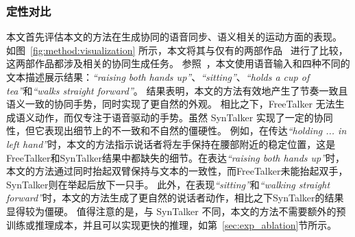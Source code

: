 \subsubsection{定性对比}
本文首先评估本文的方法在生成协同的语音同步、语义相关的运动方面的表现。
如图~\ref{fig:method:visualization} 所示，本文将其与仅有的两部作品~\cite{yang2024freetalker,chen2024syntalker} 进行了比较，这两部作品都涉及相关的协同生成任务。
参照~\cite{chen2024syntalker}，本文使用语音输入和四种不同的文本描述展示结果：\textit{``raising both hands up''}、\textit{``sitting''}、\textit{``holds a cup of tea''}和\textit{``walks straight forward''}。
结果表明，本文的方法有效地产生了节奏一致且语义一致的协同手势，同时实现了更自然的外观。
相比之下，FreeTalker 无法生成语义动作，而仅专注于语音驱动的手势。虽然 SynTalker 实现了一定的协同性，但它表现出细节上的不一致和不自然的僵硬性。
例如，在传达\textit{``holding ... in left hand''}时，本文的方法指示说话者将左手保持在腰部附近的稳定位置，这是FreeTalker和SynTalker结果中都缺失的细节。在表达\textit{``raising both hands up''}时，本文的方法通过同时抬起双臂保持与文本的一致性，而FreeTalker未能抬起双手，SynTalker则在举起后放下一只手。
此外，在表现\textit{``sitting''}和\textit{``walking straight forward''}时，本文的方法生成了更自然的说话者动作，相比之下SynTalker的结果显得较为僵硬。
值得注意的是，与 SynTalker 不同，本文的方法不需要额外的预训练或推理成本，并且可以实现更快的推理，如第~\ref{sec:exp_ablation}节所示。



